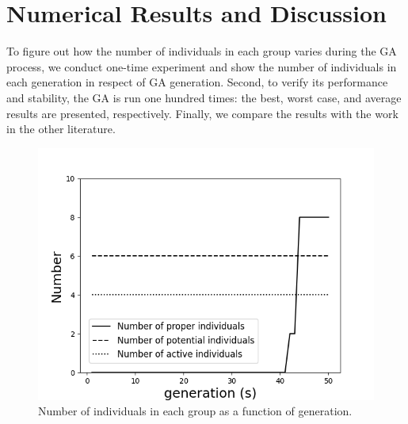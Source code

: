 \section{Numerical Results and Discussion}
To figure out how the number of individuals in each group varies during the GA
process, we conduct one-time experiment and show the number of individuals
in each generation in respect of GA generation. Second, to verify its
performance and stability, the GA is run one hundred times: the best, worst
case, and average results are presented, respectively. Finally, we compare
the results with the work in the other literature.

\begin{figure}[!htb]
	\centering
	\includegraphics[width=\linewidth]{fig/group_number.png}
	\caption{Number of individuals in each group as a function of generation.}
	\label{fig:group}
\end{figure}

